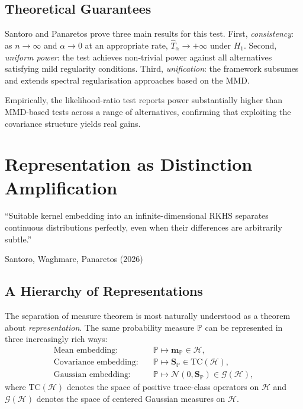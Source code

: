 \documentclass[12pt, oneside]{book}
\theoremstyle{plain}
\theoremstyle{definition}
\newcommand{\calH}{\mathcal{H}}
\newcommand{\calN}{\mathcal{N}}
\newcommand{\PP}{\mathbb{P}}
\newcommand{\mP}{\mathbf{m}_{\PP}}
\newcommand{\SP}{\mathbf{S}_{\PP}}
\newcommand{\calG}{\mathcal{G}}
\begin{document}
\section{Theoretical Guarantees}

Santoro and Panaretos \cite{SantoroPanaretos2025} prove three main results for this test. First, \emph{consistency}: as $n \to \infty$ and $\alpha \to 0$ at an appropriate rate, $\hat T_\alpha \to +\infty$ under $H_1$. Second, \emph{uniform power}: the test achieves non-trivial power against all alternatives satisfying mild regularity conditions. Third, \emph{unification}: the framework subsumes and extends spectral regularisation approaches based on the MMD.

Empirically, the likelihood-ratio test reports power substantially higher than MMD-based tests across a range of alternatives, confirming that exploiting the covariance structure yields real gains.

\chapter{Representation as Distinction Amplification}
\label{chap:amplification}

\epigraph{``Suitable kernel embedding into an infinite-dimensional RKHS separates
continuous distributions perfectly, even when their differences are arbitrarily subtle.''}%
{Santoro, Waghmare, Panaretos (2026)}

\section{A Hierarchy of Representations}

The separation of measure theorem is most naturally understood as a theorem about \emph{representation}. The same probability measure $\PP$ can be represented in three increasingly rich ways:
\begin{align}
\text{Mean embedding:} & \quad \PP \mapsto \mP \in \calH, \\
\text{Covariance embedding:} & \quad \PP \mapsto \SP \in \mathrm{TC}(\calH), \\
\text{Gaussian embedding:} & \quad \PP \mapsto \calN(0, \SP) \in \calG(\calH),
\end{align}
where $\mathrm{TC}(\calH)$ denotes the space of positive trace-class operators on $\calH$ and $\calG(\calH)$ denotes the space of centered Gaussian measures on $\calH$.
\end{document}
